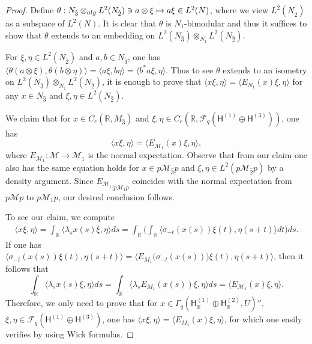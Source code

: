 \documentclass[10pt,a4paper]{amsart}
\newcommand{\R}{{\mathbb R}}
\newcommand{\cF}{{\mathcal F}}
\newcommand{\cM}{{\mathcal M}}
\newcommand{\ot}{\otimes}
\newcommand{\sH}{\mathsf{H}}
\begin{document}
\begin{proof}
Define $\theta: N_{\hat 3}\ot_{\rm alg} L^2(N_{\hat 2})\ni a\ot \xi \mapsto a\xi\in L^2(N)$,
	where we view $L^2(N_{\hat 2})$ as a subspace of $L^2(N)$.
It is clear that $\theta$ is $N_1$-bimodular 
	and thus it suffices to show that $\theta$ extends to an embedding on $L^2(N_{\hat 3 })\ot_{ N_{1} } L^2(N_{\hat 2})$.

	
For $\xi, \eta\in L^2(N_{\hat 2})$ and $a,b\in N_{\hat 3}$, one has
	$\langle \theta(a\ot \xi), \theta(b\ot \eta)\rangle=\langle a\xi, b\eta\rangle=\langle b^*a \xi, \eta\rangle$.
Thus to see $\theta$ extends to an isometry on $L^2(N_{\hat 3 })\ot_{ N_{1} } L^2(N_{\hat 2})$, 
	it is enough to prove that 
	$\langle x \xi, \eta\rangle=\langle E_{N_{1}}(x)\xi, \eta\rangle$ for any $x\in N_{\hat 3}$ and $\xi,\eta\in L^2(N_{\hat 2})$.

We claim that for $x\in C_c(\R, M_{\hat 3})$ and $\xi,\eta\in C_c(\R, \cF_q(\sH^{(1)}\oplus \sH^{(3)}))$, 
	one has
$$
\langle x\xi, \eta\rangle=\langle E_{\cM_1}(x)\xi,\eta\rangle,
$$
where $E_{\cM_1}: \cM\to \cM_1$ is the normal expectation.
Observe that from our claim one also has the same equation holds for $x\in p\cM_{\hat 3} p$
	and $\xi,\eta \in L^2(p\cM_{\hat 2} p)$ by a density argument.
Since ${E_{\cM_1}}_{\mid p\cM_1 p}$ coincides with the normal expectation from $p\cM p$ to $p\cM_1 p$,
	our desired conclusion follows.

To see our claim, we compute
\[
\begin{aligned}
\langle x\xi, \eta\rangle=\int_\R \langle \lambda_sx(s)\xi,\eta\rangle ds
	=\int_\R \Big(\int_\R \langle \sigma_{-t}(x(s))\xi(t),\eta(s+t)\rangle dt \Big)ds.
\end{aligned}
\]
If one has $\langle \sigma_{-t}(x(s))\xi(t),\eta(s+t)\rangle=\langle E_{M_1}\big (\sigma_{-t}(x(s))\big)\xi(t), \eta(s+t)\rangle$,
	then it follows that 
$$
\int_\R \langle \lambda_sx(s)\xi,\eta\rangle ds=\int_\R \langle \lambda_s E_{M_1}(x(s))\xi,\eta\rangle ds=\langle E_{\cM_1}(x)\xi,\eta\rangle.
$$
Therefore, we only need to prove that for $x\in \Gamma_q(\sH_\R^{(1)}\oplus \sH_\R^{(2)}, U)''$, $\xi,\eta\in \cF_q(\sH^{(1)}\oplus \sH^{(3)})$,
	one has $\langle x\xi,\eta\rangle=\langle E_{M_1}(x)\xi,\eta\rangle$, for which one easily verifies by using Wick formulas.
\end{proof}
\end{document}
